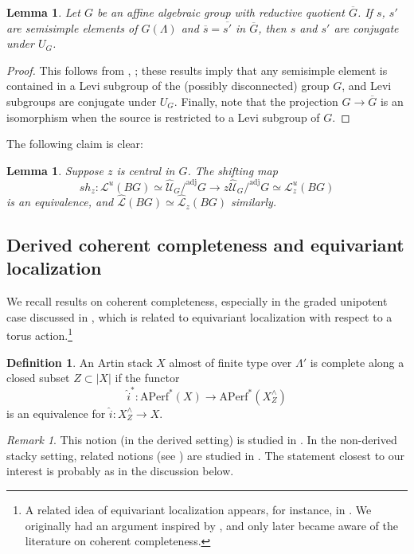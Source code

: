 \documentclass{amsart}
\newtheorem{lemma}[theorem]{Lemma}
\theoremstyle{definition}
\newtheorem{definition}[theorem]{Definition}
\theoremstyle{remark}
\newtheorem{remark}[theorem]{Remark}
\numberwithin{equation}{section}
\newcommand{\mc}{\mathcal}
\newcommand{\wh}{\widehat}
\newcommand{\Aperf}{\mathrm{APerf}}
\newcommand{\adj}{\mathrm{adj}}
\begin{document}
\begin{lemma}\label{lemma: semisimpleconjugation}
Let $G$ be an affine algebraic group with reductive quotient $\overline{G}$. If $s$, $s'$ are semisimple elements of $G(\Lambda)$ and $\overline{s}=\overline{s'}$ in $\overline{G}$, then $s$ and $s'$ are conjugate under $U_G$.   
\end{lemma}

\begin{proof}
This follows from \cite[Theorem VIII.4.3]{hochschild1981basic}, \cite{mostow1956fully}; these results imply that any semisimple element is contained in a Levi subgroup of the (possibly disconnected) group $G$, and Levi subgroups are conjugate under $U_{G}$. Finally, note that the projection $G \rightarrow \overline{G}$ is an isomorphism when the source is restricted to a Levi subgroup of $G$.
\end{proof}

The following claim is clear:

\begin{lemma}\label{lem: ShiftingMap}
Suppose $z$ is central in $G$. The shifting map
\[
sh_z\colon \mc L^u (BG) \simeq \wh{\mc U}_G /^\adj G \to z\wh{\mc U}_G /^\adj G \simeq \mc L^u_z (BG)
\]
is an equivalence, and $\wh{\mc L}(BG)\simeq \wh{\mc L}_z(BG)$ similarly. 
\end{lemma}

\subsection{Derived coherent completeness and equivariant localization}
We recall results on coherent completeness, especially in the graded unipotent case discussed in \cite{AlperHallLim}, which is related to equivariant localization with respect to a torus action.\footnote{A related idea of equivariant localization appears, for instance, in \cite{Chenequivariant}. We originally had an argument inspired by \cite{Chenequivariant}, and only later became aware of the literature on coherent completeness.}

\begin{definition}
An Artin stack $X$ almost of finite type over $\Lambda'$ is complete along a closed subset $Z\subset \lvert X\rvert$ if the functor
\[
\wh{i}^* \colon \Aperf^*(X) \to \Aperf^*(X^\wedge_Z)
\]
is an equivalence for $\wh{i}\colon X^\wedge_Z\to X$.
\end{definition}

\begin{remark}
This notion (in the derived setting) is studied in \cite{HalpernLeistnerPreygel}. In the non-derived stacky setting, related notions (see \cite[Definition 3.2, Remark 3.4]{AlperHallLim}) are studied in \cite{GeraschenkoZureickBrown, AlperHallRydhLuna, AlperHallRydhLocal, AlperHallLim}. The statement closest to our interest is probably \cite[Theorem 1.3]{AlperHallLim} as in the discussion below. 
\end{remark}
\end{document}
